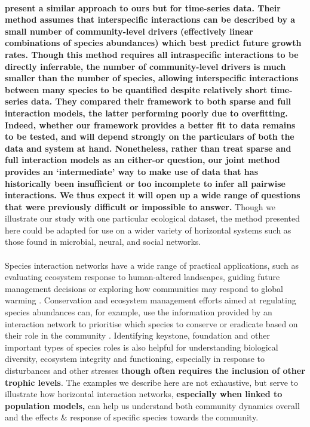 \documentclass[a4,12pt]{article}
\begin{document}
\begin{refsection}
    \paragraph{}
    \textbf{\textcite{Ovaskainen2017} present a similar approach to ours but for time-series data. Their method assumes that interspecific interactions can be described by a small number of community-level drivers (effectively linear combinations of species abundances) which best predict future growth rates. Though this method requires all intraspecific interactions to be directly inferrable, the number of community-level drivers is much smaller than the number of species, allowing interspecific interactions between many species to be quantified despite relatively short time-series data. They compared their framework to both sparse and full interaction models, the latter performing poorly due to overfitting. Indeed, whether our framework provides a better fit to data remains to be tested, and will depend strongly on the particulars of both the data and system at hand. Nonetheless, rather than treat sparse and full interaction models as an either-or question, our joint method provides an `intermediate' way to make use of data that has historically been insufficient or too incomplete to infer all pairwise interactions. We thus expect it will open up a wide range of questions that were previously difficult or impossible to answer.} Though we illustrate our study with one particular ecological dataset, the method presented here could be adapted for use on a wider variety of horizontal systems such as those found in microbial, neural, and social networks. 

    \paragraph{}
    Species interaction networks have a wide range of practical applications, such as evaluating ecosystem response to human-altered landscapes, guiding future management decisions \parencite{Ross2011} or exploring how communities may respond to global warming \parencite{Gorman2019}. Conservation and ecosystem management efforts aimed at regulating species abundances can, for example, use the information provided by an interaction network to prioritise which species to conserve or eradicate based on their role in the community \parencite{Cirtwill2018a}. Identifying keystone, foundation and other important types of species roles is also helpful for understanding biological diversity, ecosystem integrity and functioning, especially in response to disturbances and other stresses \parencite{Nyakatya2008, Orwin2016, Losapio2017, Narwani2019} \textbf{though often requires the inclusion of other trophic levels}. The examples we describe here are not exhaustive, but serve to illustrate how horizontal interaction networks, \textbf{especially when linked to population models,} can help us understand both community dynamics overall and the effects \& response of specific species towards the community. 


\end{refsection}
\end{document}
